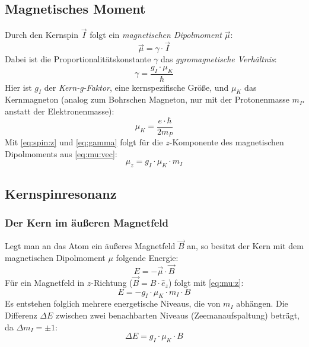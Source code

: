 \subsection{Magnetisches Moment}
Durch den Kernspin $\vec{I}$ folgt ein \emph{magnetischen Dipolmoment} $\vec{\mu}$:
\begin{equation}
  \label{eq:mu:vec}
  \vec{\mu} = \gamma \cdot \vec{I}
\end{equation}
Dabei ist die Proportionalitätskonstante $\gamma$ das \emph{gyromagnetische Verhältnis}:
\begin{equation}
  \label{eq:gamma}
  \gamma = \frac{g_I \cdot \mu_K}{\hbar}
\end{equation}
Hier ist $g_I$ der \emph{Kern-g-Faktor}, eine kernspezifische Größe, und $\mu_K$ das Kernmagneton (analog zum Bohrschen Magneton, nur mit der 
Protonenmasse $m_P$ anstatt der Elektronenmasse):
\begin{equation}
  \label{eq:muK}
  \mu_K = \frac{e \cdot \hbar}{2 m_P}
\end{equation}
Mit \autoref{eq:spin:z} und \autoref{eq:gamma} folgt für die $z$-Komponente des magnetischen Dipolmoments aus \autoref{eq:mu:vec}:
\begin{equation}
  \label{eq:mu:z}
  \mu_z = g_I \cdot \mu_K \cdot m_I
\end{equation}

\subsection{Kernspinresonanz}
\subsubsection{Der Kern im äußeren Magnetfeld}
Legt man an das Atom ein äußeres Magnetfeld $\vec{B}$ an, so besitzt der Kern mit dem magnetischen Dipolmoment $\mu$ folgende Energie:
\begin{equation}
  E = - \vec{\mu} \cdot \vec{B}
\end{equation}
Für ein Magnetfeld in $z$-Richtung ($\vec{B} = B \cdot \hat{e}_z$) folgt mit \autoref{eq:mu:z}:
\begin{equation}
  E = - g_I \cdot \mu_K \cdot m_I \cdot B
\end{equation}
Es entstehen folglich mehrere energetische Niveaus, die von $m_I$ abhängen. Die Differenz $\Delta E$ zwischen zwei benachbarten Niveaus 
(Zeemanaufspaltung) beträgt, da $\Delta m_I = \pm 1$:
\begin{equation}
  \label{eq:deltaE}
  \Delta E = g_I \cdot \mu_K \cdot B
\end{equation}

